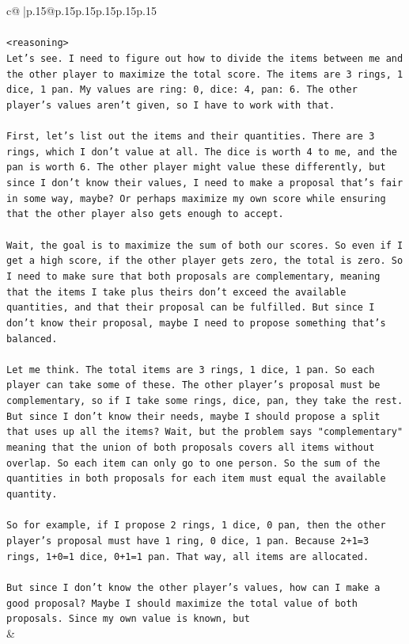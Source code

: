 \documentclass{article}
\begin{document}
{\begin{supertabular}{c@{$\;$}|p{.15\linewidth}@{}p{.15\linewidth}p{.15\linewidth}p{.15\linewidth}p{.15\linewidth}p{.15\linewidth}}
{{{\\ 
\\ 
\texttt{<reasoning>} \\
\texttt{Let's see. I need to figure out how to divide the items between me and the other player to maximize the total score. The items are 3 rings, 1 dice, 1 pan. My values are ring: 0, dice: 4, pan: 6. The other player's values aren't given, so I have to work with that.} \\
\\ 
\texttt{First, let's list out the items and their quantities. There are 3 rings, which I don't value at all. The dice is worth 4 to me, and the pan is worth 6. The other player might value these differently, but since I don't know their values, I need to make a proposal that's fair in some way, maybe? Or perhaps maximize my own score while ensuring that the other player also gets enough to accept.} \\
\\ 
\texttt{Wait, the goal is to maximize the sum of both our scores. So even if I get a high score, if the other player gets zero, the total is zero. So I need to make sure that both proposals are complementary, meaning that the items I take plus theirs don't exceed the available quantities, and that their proposal can be fulfilled. But since I don't know their proposal, maybe I need to propose something that's balanced.} \\
\\ 
\texttt{Let me think. The total items are 3 rings, 1 dice, 1 pan. So each player can take some of these. The other player's proposal must be complementary, so if I take some rings, dice, pan, they take the rest. But since I don't know their needs, maybe I should propose a split that uses up all the items? Wait, but the problem says "complementary" meaning that the union of both proposals covers all items without overlap. So each item can only go to one person. So the sum of the quantities in both proposals for each item must equal the available quantity.} \\
\\ 
\texttt{So for example, if I propose 2 rings, 1 dice, 0 pan, then the other player's proposal must have 1 ring, 0 dice, 1 pan. Because 2+1=3 rings, 1+0=1 dice, 0+1=1 pan. That way, all items are allocated.} \\
\\ 
\texttt{But since I don't know the other player's values, how can I make a good proposal? Maybe I should maximize the total value of both proposals. Since my own value is known, but} \\
            }
        }
    }
    & \\ \\


\end{supertabular}}
\end{document}
